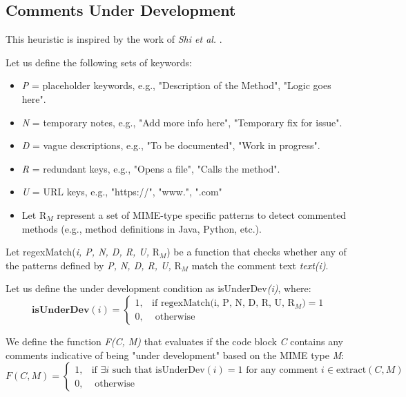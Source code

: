 \subsection{Comments Under Development}
This heuristic is inspired by the work of \textit{Shi et al.} \cite{buildingRock}.

\noindent Let us define the following sets of keywords:
	\begin{itemize}
		\item \textit{P} = placeholder keywords, e.g., "Description of the Method", "Logic goes here".
		\item \textit{N} = temporary notes, e.g., "Add more info here", "Temporary fix for issue".
		\item \textit{D} = vague descriptions, e.g., "To be documented", "Work in progress".
		\item \textit{R} = redundant keys, e.g., "Opens a file", "Calls the method".
		\item \textit{U} = URL keys, e.g., "https://", "www.", ".com"
		\item Let $\mathrm{R}_{M}$ represent a set of MIME-type specific patterns to detect commented methods (e.g., method definitions in Java, Python, etc.).
	\end{itemize}
	
\noindent Let regexMatch(\textit{i, P, N, D, R, U, } $\mathrm{R}_{M}$) be a function that checks whether any of the patterns defined by \textit{P, N, D, R, U, } $\mathrm{R}_{M}$ match the comment text \textit{text(i)}.

\noindent Let us define the under development condition as isUnderDev\textit{(i)}, where:
\begin{equation*}
	\textbf{isUnderDev}(i) = \begin{cases}
		1, & \text{if } \text{regexMatch(i, P, N, D, R, U, }  \mathrm{R}_{M}) = 1 \\
		0, & \text{ otherwise}
	\end{cases}
\end{equation*}

\noindent We define the function \textit{F(C, M)} that evaluates if the code block \textit{C} contains any comments indicative of being "under development" based on the MIME type \textit{M}:
\begin{equation*}
	F(C, M) = \begin{cases}
		1, & \text{if } \exists i \text{ such that } \text{isUnderDev}(i) = 1 \text{ for any comment } i \in \text{extract}(C, M) \\
		0, & \text{ otherwise}
	\end{cases}
\end{equation*}

